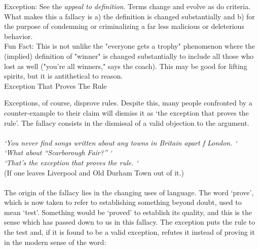 \documentclass[a4paper,12pt,single,pdftex]{scrartcl}
\begin{document}
    
      Exception: See the {\it appeal to definition}. Terms change and evolve as do criteria. What makes this a fallacy is a) the definition is changed substantially and b) for the purpose of condemning or criminalizing a far less malicious or deleterious behavior. 
    \\

    
      Fun Fact: This is not unlike the "everyone gets a trophy" phenomenon where the (implied) definition of "winner" is changed substantially to include all those who lost as well ("you're all winners," says the coach). This may be good for lifting spirits, but it is antithetical to reason.
    \\

  

 Exception That Proves The Rule
    
      Exceptions, of course, disprove rules. Despite this, many people confronted by a counter-example to their claim will dismiss it as ‘the exception that proves the rule’. The fallacy consists in the dismissal of a valid objection to the argument.
    \\

    
       
    \\

    
      {\em ‘You never find songs written about any towns in Britain apart f London. ‘}
    \\

    
      {\em ‘What about “Scarborough Fair?” ‘}
    \\

    
      {\em ‘That’s the exception that proves the rule. ‘}
    \\

    
      (If one leaves Liverpool and Old Durham Town out of it.)
    \\

    
       
    \\

    
      The origin of the fallacy lies in the changing uses of language. The word ‘prove’, which is now taken to refer to establishing something beyond doubt, used to mean ‘test’. Something would be ‘proved’ to establish its quality, and this is the sense which has passed down to us in this fallacy. The exception puts the rule to the test and, if it is found to be a valid exception, refutes it instead of proving it in the modern sense of the word:
    \\
\end{document}

